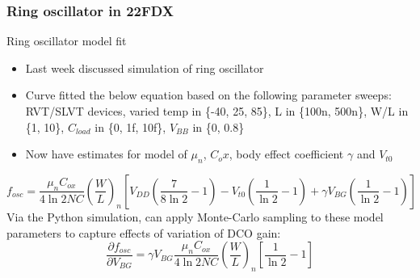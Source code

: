 \documentclass[t, screen, aspectratio=43]{beamer}
\begin{document}
\begin{frame}
	\frametitle{Ring oscillator in 22FDX}
	\begin{block}{Ring oscillator model fit}
	\scriptsize
	\begin{itemize}
		\item Last week discussed simulation of ring oscillator
		\item Curve fitted the below equation based on the following parameter sweeps: RVT/SLVT devices, varied temp in \{-40, 25, 85\}, L in \{100n, 500n\}, W/L in \{1, 10\}, $C_{load}$ in \{0, 1f, 10f\}, $V_{BB}$ in \{0, 0.8\}
		\item Now have estimates for model of $\mu_n$, $C_ox$, body effect coefficient $\gamma$ and $V_{t0}$
	\end{itemize}
	\begin{equation}
		f_{osc} = \frac{\mu_nC_{ox}}{4\ln2NC}\left(\frac{W}{L}\right)_n\left[V_{DD}\left(\frac{7}{8\ln2}-1\right)-V_{t0}\left(\frac{1}{\ln2}-1\right) + \gamma V_{BG}\left(\frac{1}{\ln2}-1\right) \right]
	\end{equation}
	Via the Python simulation, can apply Monte-Carlo sampling to these model parameters to capture effects of variation of DCO gain:
	\begin{equation}
		\frac{\partial f_{osc}}{\partial V_{BG}} = \gamma V_{BG}\frac{\mu_nC_{ox}}{4\ln2NC}\left(\frac{W}{L}\right)_n\left[\frac{1}{\ln2}-1\right]
	\end{equation}	  
	\end{block}
\end{frame}
\end{document}
